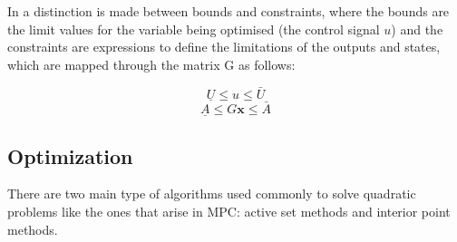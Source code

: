 In \cite{Ferreau2006} a distinction is made between bounds and constraints, where the bounds are the limit values for the variable being optimised (the control signal $u$) and the constraints are expressions to define the limitations of the outputs and states, which are mapped through the matrix G as follows:

\begin{equation} \label{constraints1}
\underline{U} \leq u \leq \bar{U}
\end{equation}
\begin{equation} \label{constraints2}
\underline{A} \leq G\mathbf{x} \leq \bar{A} 
\end{equation}


\subsection{Optimization}%

There are two main type of algorithms used commonly to solve quadratic problems like the ones that arise in MPC: active set methods and interior point methods.


